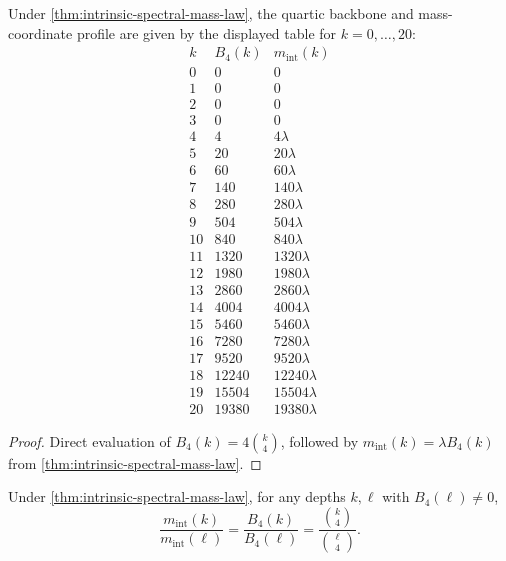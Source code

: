\begin{proposition}
\label{prop:unnormalized-intrinsic-mass-table}
Under \cref{thm:intrinsic-spectral-mass-law}, the quartic backbone and
mass-coordinate profile are given by the displayed table for
\(k=0,\dots,20\):
\[
\begin{array}{c|c|c}
k & B_4(k) & m_{\mathrm{int}}(k) \\
\hline
0 & 0 & 0 \\
1 & 0 & 0 \\
2 & 0 & 0 \\
3 & 0 & 0 \\
4 & 4 & 4\lambda \\
5 & 20 & 20\lambda \\
6 & 60 & 60\lambda \\
7 & 140 & 140\lambda \\
8 & 280 & 280\lambda \\
9 & 504 & 504\lambda \\
10 & 840 & 840\lambda \\
11 & 1320 & 1320\lambda \\
12 & 1980 & 1980\lambda \\
13 & 2860 & 2860\lambda \\
14 & 4004 & 4004\lambda \\
15 & 5460 & 5460\lambda \\
16 & 7280 & 7280\lambda \\
17 & 9520 & 9520\lambda \\
18 & 12240 & 12240\lambda \\
19 & 15504 & 15504\lambda \\
20 & 19380 & 19380\lambda
\end{array}
\]
\end{proposition}

\begin{proof}
Direct evaluation of
\(B_4(k)=4\binom{k}{4}\), followed by
\(m_{\mathrm{int}}(k)=\lambda B_4(k)\)
from \cref{thm:intrinsic-spectral-mass-law}.
\end{proof}

\begin{theorem}
\label{thm:exact-ratio-law}
Under \cref{thm:intrinsic-spectral-mass-law}, for any depths
\(k,\ell\) with \(B_4(\ell)\neq0\),
\[
  \frac{m_{\mathrm{int}}(k)}{m_{\mathrm{int}}(\ell)}
  =
  \frac{B_4(k)}{B_4(\ell)}
  =
  \frac{\binom{k}{4}}{\binom{\ell}{4}}.
\]
\end{theorem}

